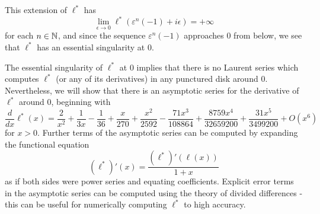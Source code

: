 \documentclass[letterpaper,11pt]{article}
\begin{document}
This extension of $\ell^*$ has
\[
\lim_{\epsilon \rightarrow 0} \ell^*(\varepsilon^n(-1) + i\epsilon) = +\infty
\]
for each $n \in \mathbb{N}$, and since the sequence $\varepsilon^n(-1)$ approaches $0$ from below, we see that $\ell^*$ has an essential singularity at $0$.

The essential singularity of $\ell^*$ at $0$ implies that there is no Laurent series which computes $\ell^*$ (or any of its derivatives) in any punctured disk around $0$. Nevertheless, we will show that there is an asymptotic series for the derivative of $\ell^*$ around $0$, beginning with
\[
\frac{d}{dx}\ell^*(x) = \frac{2}{x^2} + \frac{1}{3x} - \frac{1}{36} + \frac{x}{270} + \frac{x^2}{2592} - \frac{71x^3}{108864} + \frac{8759x^4}{32659200} + \frac{31x^5}{3499200} + O(x^6)
\]
for $x > 0$. Further terms of the asymptotic series can be computed by expanding the functional equation
\[
(\ell^*)'(x) = \frac{(\ell^*)'(\ell(x))}{1+x}
\]
as if both sides were power series and equating coefficients. Explicit error terms in the asymptotic series can be computed using the theory of divided differences - this can be useful for numerically computing $\ell^*$ to high accuracy.
\end{document}

